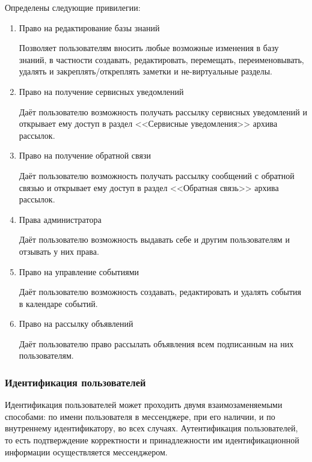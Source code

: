     Определены следующие привилегии:
    \begin{enumerate}
        \item \label{itm:req:sec:privs:kbedit}
            Право на редактирование базы знаний

            Позволяет пользователям вносить любые возможные изменения в базу знаний,
            в частности создавать, редактировать, перемещать, переименовывать, удалять
            и закреплять/откреплять заметки и не-виртуальные разделы.

        \item \label{itm:req:sec:privs:service}
            Право на получение сервисных уведомлений

            Даёт пользователю возможность получать рассылку сервисных уведомлений и открывает ему доступ
            в раздел <<Сервисные уведомления>> архива рассылок.

        \item \label{itm:req:sec:privs:feedback}
            Право на получение обратной связи

            Даёт пользователю возможность получать рассылку сообщений с обратной связью и
            открывает ему доступ в раздел <<Обратная связь>> архива рассылок.

        \item \label{itm:req:sec:privs:admin}
            Права администратора

            Даёт пользователю возможность выдавать себе и другим пользователям и
            отзывать у них права.

        \item \label{itm:req:sec:privs:calendar}
            Право на управление событиями

            Даёт пользователю возможность создавать, редактировать и удалять события в календаре событий.

        \item \label{itm:req:sec:privs:announce}
            Право на рассылку объявлений

            Даёт пользователю право рассылать объявления всем подписанным на них пользователям.
    \end{enumerate}

\subsubsection{Идентификация пользователей}
    \label{sec:req:sec:id}
    Идентификация пользователей может проходить двумя взаимозаменяемыми способами:
    по имени пользователя в мессенджере, при его наличии, и по внутреннему идентификатору,
    во всех случаях. Аутентификация пользователей, то есть подтверждение корректности и
    принадлежности им идентификационной информации осуществляется мессенджером.

